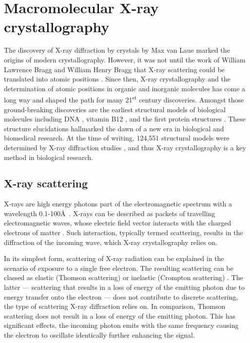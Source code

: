 
%
%

\section{Macromolecular X-ray crystallography}
The discovery of X-ray diffraction by crystals by Max van Laue \cite{Friedrich1913-vx,Laue1913-sn} marked the origins of modern crystallography. However, it was not until the work of William Lawrence Bragg and William Henry Bragg that X-ray scattering could be translated into atomic positions \cite{Bragg1913-cx,Bragg1929-xp,Bragg1912-ht}. Since then, X-ray crystallography and the determination of atomic positions in organic and inorganic molecules has come a long way and shaped the path for many 21\textsuperscript{st} century discoveries. Amongst those ground-breaking discoveries are the earliest structural models of biological molecules including DNA \cite{Watson1953-qw}, vitamin B12 \cite{Hodgkin1956-mx}, and the first protein structures \cite{Blundell1971-mv,Blake1965-ng,Perutz1960-qz,Kendrew1958-on}. These structure elucidations hallmarked the dawn of a new era in biological and biomedical research. At the time of writing, 124,551 structural models were determined by X-ray diffraction studies \cite{Berman2000-ua}, and thus X-ray crystallography is a key method in biological research.

\subsection{X-ray scattering}
X-rays are high energy photons part of the electromagnetic spectrum with a wavelength 0.1-100\AA\ \cite{Rupp2010-nc}. X-rays can be described as packets of travelling electromagnetic waves, whose electric field vector interacts with the charged electrons of matter \cite{Rupp2010-nc}. Such interaction, typically termed scattering, results in the diffraction of the incoming wave, which X-ray crystallography relies on.

In its simplest form, scattering of X-ray radiation can be explained in the scenario of exposure to a single free electron. The resulting scattering can be classed as elastic (Thomson scattering) or inelastic (Crompton scattering) \cite{Rupp2010-nc}. The latter --- scattering that results in a loss of energy of the emitting photon due to energy transfer onto the electron --- does not contribute to discrete scattering, the type of scattering X-ray diffraction relies on. In comparison, Thomson scattering does not result in a loss of energy of the emitting photon. This has significant effects, the incoming photon emits with the same frequency causing the electron to oscillate identically further enhancing the signal.

